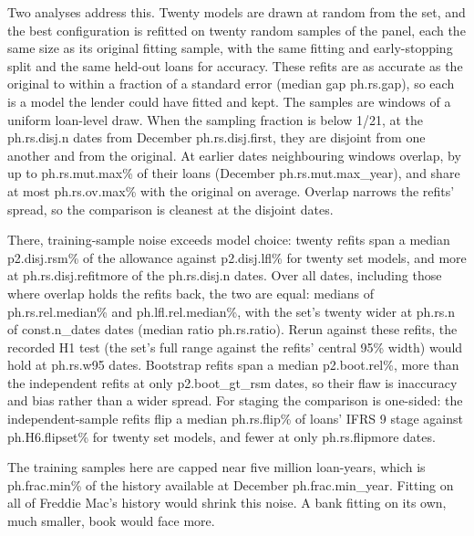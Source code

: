 Two analyses address this. Twenty models are drawn at random from the set,
and the best configuration is refitted on twenty random samples of the panel,
each the same size as its original fitting sample, with the same fitting and
early-stopping split and the same held-out loans for accuracy. These refits
are as accurate as the original to within a fraction of a standard error
(median gap \num{ph.rs.gap}), so each is a model the lender could have fitted
and kept. The samples are windows of a uniform loan-level draw. When the
sampling fraction is below 1/21, at the \num{ph.rs.disj.n} dates from December
\num{ph.rs.disj.first}, they are disjoint from one another and from the
original. At earlier dates neighbouring windows overlap, by up to
\num{ph.rs.mut.max}\% of their loans (December \num{ph.rs.mut.max_year}), and
share at most \num{ph.rs.ov.max}\% with the original on average. Overlap
narrows the refits' spread, so the comparison is cleanest at the disjoint
dates.

There, training-sample noise exceeds model choice: twenty refits span a median
\num{p2.disj.rsm}\% of the allowance against \num{p2.disj.lfl}\% for twenty set
models, and more at \num{ph.rs.disj.refitmore} of the \num{ph.rs.disj.n}
dates. Over all dates, including those where overlap holds the refits back,
the two are equal: medians of \num{ph.rs.rel.median}\% and \num{ph.lfl.rel.median}\%, with
the set's twenty wider at \num{ph.rs.n} of \num{const.n_dates} dates (median
ratio \num{ph.rs.ratio}). Rerun against these refits, the recorded H1 test
(the set's full range against the refits' central 95\% width) would hold at
\num{ph.rs.w95} dates. Bootstrap refits span a median \num{p2.boot.rel}\%, more
than the independent refits at only \num{p2.boot_gt_rsm} dates, so their flaw
is inaccuracy and bias rather than a wider spread. For staging the comparison
is one-sided: the independent-sample refits flip a median \num{ph.rs.flip}\%
of loans' IFRS 9 stage against \num{ph.H6.flipset}\% for twenty set models, and
fewer at only \num{ph.rs.flipmore} dates.

The training samples here are capped near five million loan-years, which is
\num{ph.frac.min}\% of the history available at December
\num{ph.frac.min_year}. Fitting on all of Freddie Mac's history would shrink
this noise. A bank fitting on its own, much smaller, book would face more.

